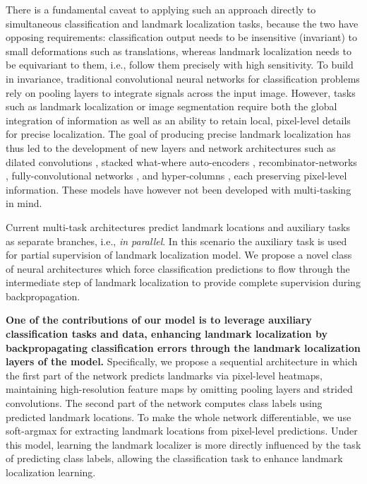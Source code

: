 \documentclass[10pt,twocolumn,letterpaper]{article}
\begin{document}
There is a fundamental caveat to applying such an approach directly to simultaneous classification and landmark localization tasks, because the two have opposing requirements: classification output needs to be insensitive (invariant) to small deformations such as translations, whereas landmark localization needs to be equivariant to them, i.e., follow them precisely with high sensitivity. To build in invariance, traditional convolutional neural networks for classification problems rely on pooling layers to integrate signals across the input image. However, tasks such as landmark localization or image segmentation require both the global integration of information as well as an ability to retain local, pixel-level details for precise localization.
The goal of producing precise landmark localization has thus led to the development of new layers and network architectures such as dilated convolutions \cite{yu2015multi}, stacked what-where auto-encoders \cite{Zhao2015StackedWA}, recombinator-networks \cite{honari2016recombinator}, fully-convolutional networks \cite{long2015fully}, and hyper-columns \cite{hariharan2015hypercolumns}, each preserving pixel-level information.
These models have however not been developed with multi-tasking in mind.

Current multi-task architectures \cite{zhang2014facialMTFL, zhang2016MAFL, zhang2014improving, devries2014multi, ranjan2016hyperface} predict landmark locations and auxiliary tasks as separate branches, i.e., \emph{in parallel}. In this scenario the auxiliary task is used for partial supervision of landmark localization model.
We propose a novel class of neural architectures which force classification predictions to flow through the intermediate step of landmark localization to provide complete supervision during backpropagation.

\textbf{
One of the contributions of our model is to
leverage auxiliary classification tasks and data, enhancing landmark localization by backpropagating classification errors through the landmark localization layers of the model.} 
Specifically, we propose a sequential architecture in which the first part of the network predicts landmarks via pixel-level heatmaps, maintaining high-resolution feature maps by omitting pooling layers and strided convolutions. The second part of the network computes class labels using predicted landmark locations. To make the whole network differentiable, we use soft-argmax for extracting landmark locations from pixel-level predictions.
Under this model, learning the landmark localizer is more directly influenced by the task of predicting class labels, allowing the classification task to enhance landmark localization learning.
\end{document}

